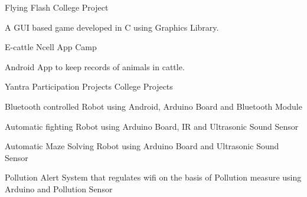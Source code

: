 \begin{cventries}
  \cventry
    {} %
    {Flying Flash} %
    {College Project} %
    {} %
    {
      \begin{cvitems} %
      	\item {A GUI based game developed in C using Graphics Library.}
      \end{cvitems}
    }
    
  \cventry
    {} %
    {E-cattle} %
    {Ncell App Camp} %
    {} %
    {
      \begin{cvitems} %
      	\item {Android App to keep records of animals in cattle.}
      \end{cvitems}
    }
    
  \cventry
    {} %
    {Yantra Participation Projects} %
    {College Projects} %
    {} %
    {
      \begin{cvitems} %
      	\item {Bluetooth controlled Robot using Android, Arduino Board and Bluetooth Module}
      	\item {Automatic fighting Robot using Arduino Board, IR and Ultrasonic Sound Sensor}
      	\item {Automatic Maze Solving Robot using Arduino Board and Ultrasonic Sound Sensor}
      	\item {Pollution Alert System that regulates wifi on the basis of Pollution measure using Arduino and Pollution Sensor}
      \end{cvitems}
    }
\end{cventries}
